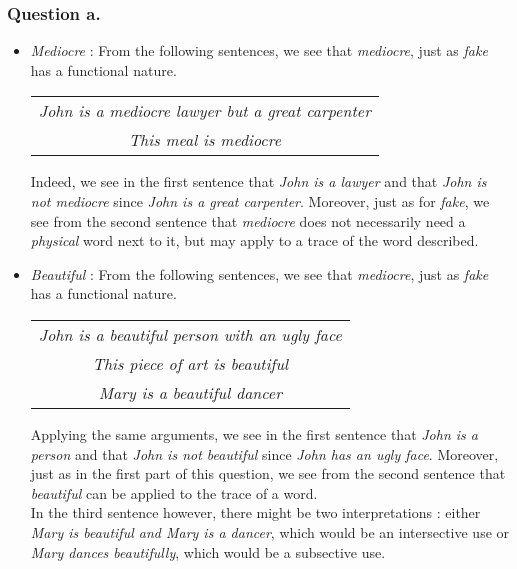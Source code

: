 \documentclass{cours}
\begin{document}
            \subsubsection{Question a.}
                \begin{itemize}
                    \item \textsl{Mediocre} : From the following sentences, we see that \textsl{mediocre}, just as \textsl{fake} has a functional nature.
                    \begin{center}
                        \begin{tabular}{c}
                            \textsl{John is a mediocre lawyer but a great carpenter}\\
                            \textsl{This meal is mediocre}
                        \end{tabular}
                    \end{center}
                    Indeed, we see in the first sentence that \textsl{John is a lawyer} and that \textsl{John is not mediocre} since \textsl{John is a great carpenter}. Moreover, just as for \textsl{fake}, we see from the second sentence that \textsl{mediocre} does not necessarily need a \textit{physical} word next to it, but may apply to a trace of the word described.

                    \item \textsl{Beautiful} : From the following sentences, we see that \textsl{mediocre}, just as \textsl{fake} has a functional nature.
                    \begin{center}
                        \begin{tabular}{c}
                            \textsl{John is a beautiful person with an ugly face}\\
                            \textsl{This piece of art is beautiful}\\
                            \textsl{Mary is a beautiful dancer}
                        \end{tabular}
                    \end{center}
                    Applying the same arguments, we see in the first sentence that \textsl{John is a person} and that \textsl{John is not beautiful} since \textsl{John has an ugly face}. Moreover, just as in the first part of this question, we see from the second sentence that \textsl{beautiful} can be applied to the trace of a word.\\ 
                    In the third sentence however, there might be two interpretations : either \textsl{Mary is beautiful and Mary is a dancer}, which would be an intersective use or \textsl{Mary dances beautifully}, which would be a subsective use. 
                \end{itemize}
\end{document}
